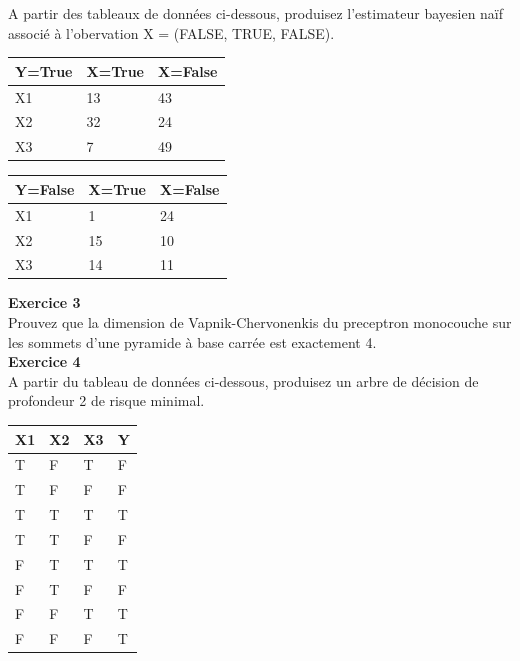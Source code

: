 \documentclass[a4paper]{article}
\begin{document}
A partir des tableaux de données ci-dessous, produisez l'estimateur bayesien naïf associé à l'obervation X = (FALSE, TRUE, FALSE).\\

\begin{tabular}{|l|l|l|}
\hline
Y=True & X=True & X=False\\
\hline
X1 & 13 & 43\\
X2 & 32 & 24\\
X3 & 7 & 49\\
\hline
\end{tabular}

\vspace{0.3cm}

\begin{tabular}{|l|l|l|}
\hline
Y=False & X=True & X=False\\
\hline
X1 & 1 & 24\\
X2 & 15 & 10\\
X3 & 14 & 11\\
\hline
\end{tabular}

\vspace{0.3cm}

\textbf{Exercice 3}\\

Prouvez que la dimension de Vapnik-Chervonenkis du preceptron monocouche sur les sommets d'une pyramide à base carrée est exactement 4.\\

\textbf{Exercice 4}\\
A partir du tableau de données ci-dessous, produisez un arbre de décision de profondeur 2 de risque minimal.\\

\begin{tabular}{|l|l|l|l|}
\hline
X1 & X2 & X3 & Y\\
\hline
T &F &T &F\\
T &F &F &F\\
T &T &T &T\\
T &T &F &F\\
F &T &T &T\\
F &T &F &F\\
F &F &T &T\\
F &F &F &T\\
\hline
\end{tabular}

\end{document}
